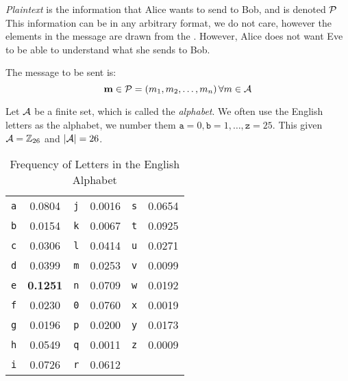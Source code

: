 \begin{definition}[Plaintext]\label{def:Plaintext}
  \emph{Plaintext} is the information that Alice wants to send to Bob, and is denoted $\operatorname{\mathcal{P}}$
  This information can be in any arbitrary format, we do not care, however the elements in the message are drawn from the .
  However, Alice does not want Eve to be able to understand what she sends to Bob.

  The message to be sent is:
  \begin{equation}\label{eq:Plaintext}
    \operatorname{\mathbf{m}} \in \operatorname{\mathcal{P}} = \left( m_{1}, m_{2}, \ldots, m_{n} \right) \forall m \in \operatorname{\mathcal{A}}
  \end{equation}
\end{definition}

\begin{definition}[Alphabet]\label{def:Alphabet}
  Let $\operatorname{\mathcal{A}}$ be a finite set, which is called the \emph{alphabet}.
  We often use the English letters as the alphabet, we number them $\mathtt{a} = 0, \mathtt{b} = 1, \ldots, \mathtt{z} = 25$.
  This given $\operatorname{\mathcal{A}} = \operatorname{\mathbb{Z}}_{26}$ and $\lvert \operatorname{\mathcal{A}} \rvert = 26$.

  \begin{table}[h!]
    \centering
    \begin{tabular}{cccccc}
      \toprule
      \texttt{a} & 0.0804 & \texttt{j} & 0.0016 & \texttt{s} & 0.0654 \\
      \texttt{b} & 0.0154 & \texttt{k} & 0.0067 & \texttt{t} & 0.0925 \\
      \texttt{c} & 0.0306 & \texttt{l} & 0.0414 & \texttt{u} & 0.0271 \\
      \texttt{d} & 0.0399 & \texttt{m} & 0.0253 & \texttt{v} & 0.0099 \\
      \texttt{e} & \textbf{0.1251} & \texttt{n} & 0.0709 & \texttt{w} & 0.0192 \\
      \texttt{f} & 0.0230 & \texttt{0} & 0.0760 & \texttt{x} & 0.0019 \\
      \texttt{g} & 0.0196 & \texttt{p} & 0.0200 & \texttt{y} & 0.0173 \\
      \texttt{h} & 0.0549 & \texttt{q} & 0.0011 & \texttt{z} & 0.0009 \\
      \texttt{i} & 0.0726 & \texttt{r} & 0.0612 & & \\
      \bottomrule
    \end{tabular}
    \caption{Frequency of Letters in the English Alphabet}
    \label{tab:Frequency_Letters_English_Alphabet}
  \end{table}
\end{definition}

